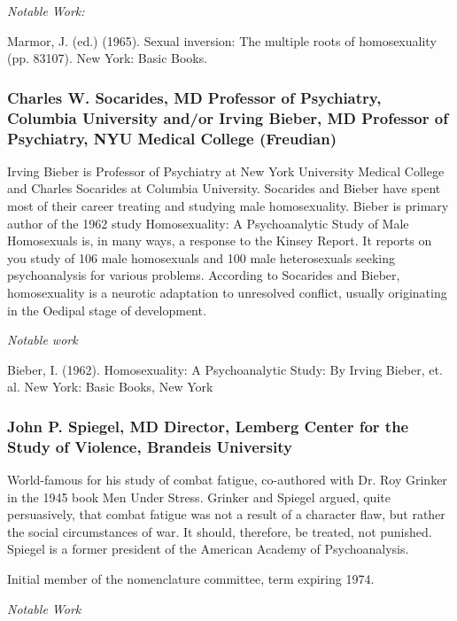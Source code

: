 \begin{refsection}
\emph{Notable Work:}

Marmor, J. (ed.) (1965). Sexual inversion: The multiple roots of homosexuality (pp. 83107). New York: Basic Books.

\subsubsection{Charles W. Socarides, MD Professor of Psychiatry, Columbia University and\slash or Irving Bieber, MD Professor of Psychiatry, NYU Medical College (Freudian)}
\label{charlesw.socaridesmdprofessorofpsychiatrycolumbiauniversityandorirvingbiebermdprofessorofpsychiatrynyumedicalcollegefreudian}

Irving Bieber is Professor of Psychiatry at New York University Medical College and Charles Socarides at Columbia University. Socarides and Bieber have spent most of their career treating and studying male homosexuality. Bieber is primary author of the 1962 study Homosexuality: A Psychoanalytic Study of Male Homosexuals is, in many ways, a response to the Kinsey Report. It reports on you study of 106 male homosexuals and 100 male heterosexuals seeking psychoanalysis for various problems. According to Socarides and Bieber, homosexuality is a neurotic adaptation to unresolved conflict, usually originating in the Oedipal stage of development.

\emph{Notable work}

Bieber, I. (1962). Homosexuality: A Psychoanalytic Study: By Irving Bieber, et. al. New York: Basic Books, New York

\subsubsection{John P. Spiegel, MD Director, Lemberg Center for the Study of Violence, Brandeis University}
\label{johnp.spiegelmddirectorlembergcenterforthestudyofviolencebrandeisuniversity}

World-famous for his study of combat fatigue, co-authored with Dr. Roy Grinker in the 1945 book Men Under Stress. Grinker and Spiegel argued, quite persuasively, that combat fatigue was not a result of a character flaw, but rather the social circumstances of war. It should, therefore, be treated, not punished. Spiegel is a former president of the American Academy of Psychoanalysis.

Initial member of the nomenclature committee, term expiring 1974.

\emph{Notable Work}


\end{refsection}
